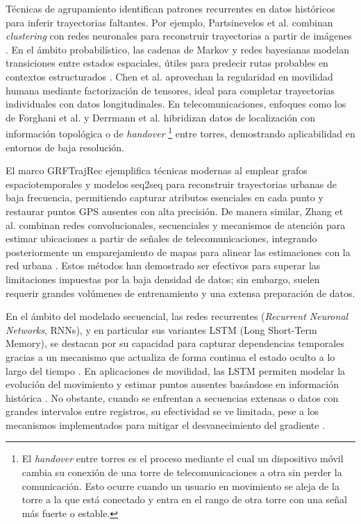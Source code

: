 Técnicas de agrupamiento identifican patrones recurrentes en datos históricos para inferir trayectorias faltantes. Por ejemplo, Partsinevelos et al. combinan \textit{clustering} con redes neuronales para reconstruir trayectorias a partir de imágenes \cite{partsinevelos2005reconstructing}. En el ámbito probabilístico, las cadenas de Markov y redes bayesianas modelan transiciones entre estados espaciales, útiles para predecir rutas probables en contextos estructurados \cite{wang2016trajectory, jiang2022vehicle}. Chen et al. \cite{chen2019complete} aprovechan la regularidad en movilidad humana mediante factorización de tensores, ideal para completar trayectorias individuales con datos longitudinales. En telecomunicaciones, enfoques como los de Forghani et al. \cite{forghani2020cellular} y Derrmann et al. \cite{derrmann2019road} hibridizan datos de localización con información topológica o de \textit{handover} \footnote{El \textit{handover} entre torres es el proceso mediante el cual un dispositivo móvil cambia su conexión de una torre de telecomunicaciones a otra sin perder la comunicación. Esto ocurre cuando un usuario en movimiento se aleja de la torre a la que está conectado y entra en el rango de otra torre con una señal más fuerte o estable.} entre torres, demostrando aplicabilidad en entornos de baja resolución.

El marco GRFTrajRec \cite{zhaograph} ejemplifica técnicas modernas al emplear grafos espaciotemporales y modelos seq2seq para reconstruir trayectorias urbanas de baja frecuencia, permitiendo capturar atributos esenciales en cada punto y restaurar puntos GPS ausentes con alta precisión. De manera similar, Zhang et al. \cite{zhang2019prnet} combinan redes convolucionales, secuenciales y mecanismos de atención para estimar ubicaciones a partir de señales de telecomunicaciones, integrando posteriormente un emparejamiento de mapas para alinear las estimaciones con la red urbana \cite{zheng2014urban}. Estos métodos han demostrado ser efectivos para superar las limitaciones impuestas por la baja densidad de datos; sin embargo, suelen requerir grandes volúmenes de entrenamiento y una extensa preparación de datos.

En el ámbito del modelado secuencial, las redes recurrentes (\textit{Recurrent Neuronal Networks}, RNNs), y en particular sus variantes LSTM (Long Short-Term Memory), se destacan por su capacidad para capturar dependencias temporales gracias a un mecanismo que actualiza de forma continua el estado oculto a lo largo del tiempo \cite{elman1990finding}. En aplicaciones de movilidad, las LSTM permiten modelar la evolución del movimiento y estimar puntos ausentes basándose en información histórica \cite{manh2018scene, altche2017lstm}. No obstante, cuando se enfrentan a secuencias extensas o datos con grandes intervalos entre registros, su efectividad se ve limitada, pese a los mecanismos implementados para mitigar el desvanecimiento del gradiente \cite{hochreiter1991untersuchungen}.

